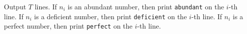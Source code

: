 Output $T$ lines.
If $n_i$ is an abundant number, then print \verb+abundant+ on the $i$-th line.
If $n_i$ is a deficient number, then print \verb+deficient+ on the $i$-th line.
If $n_i$ is a perfect number, then print \verb+perfect+ on the $i$-th line.
